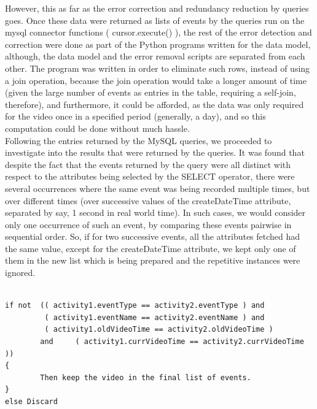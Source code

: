 \documentclass[16pt]{report}
\begin{document}
However, this as far as the error correction and redundancy reduction by queries goes. Once these data were returned as lists of events by the queries run on the mysql connector functions ( cursor.execute() ), the rest of the error detection and correction were done as part of the Python programs written for the data model, although, the data model and the error removal scripts are separated from each other. The program was written in order to eliminate such rows, instead of using a join operation, because the join operation would take a longer amount of time (given the large number of events as entries in the table, requiring a self-join, therefore), and furthermore, it could be afforded, as the data was only required for the video once in a specified period (generally, a day), and so this computation could be done without much hassle. \\


Following the entries returned by the MySQL queries, we proceeded to investigate into the results that were returned by the queries. It was found that despite the fact that the events returned by the query were all distinct with respect to the attributes being selected by the SELECT operator, there were several occurrences where the same event was being recorded multiple times, but over different times (over successive values of the createDateTime attribute, separated by say, 1 second in real world time).  In such cases, we would consider only one occurrence of such an event, by comparing these events pairwise in sequential order. So, if for two successive events, all the attributes fetched had the same value, except for the createDateTime attribute, we kept only one of them in the new list which is being prepared and the repetitive instances were ignored.

\begin{verbatim}

if not 	(( activity1.eventType == activity2.eventType ) and 
         ( activity1.eventName == activity2.eventName ) and
         ( activity1.oldVideoTime == activity2.oldVideoTime ) 
        and 	( activity1.currVideoTime == activity2.currVideoTime ))
{	
    	Then keep the video in the final list of events.
}
else Discard

\end{verbatim}
\end{document}
